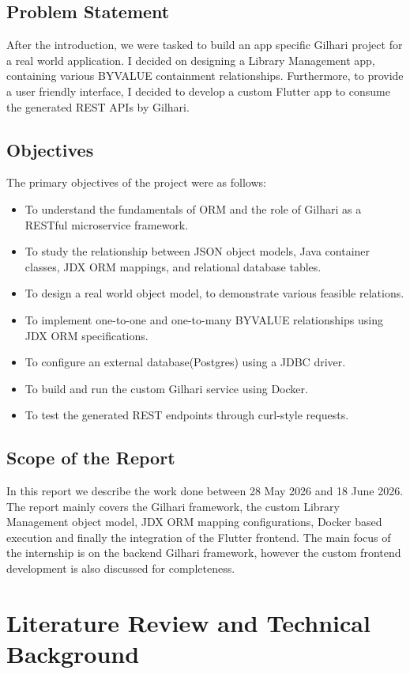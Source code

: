 \documentclass{book}
\begin{document}
\section{Problem Statement}
After the introduction, we were tasked to build an app specific Gilhari project for a real world application. I decided on designing a Library Management app, containing various BYVALUE containment relationships. Furthermore, to provide a user friendly interface, I decided to develop a custom Flutter app to consume the generated REST APIs by Gilhari.

\section{Objectives}
The primary objectives of the project were as follows:
\begin{itemize}[itemsep=0pt]
\item To understand the fundamentals of ORM and the role of Gilhari as a RESTful microservice framework.
\item To study the relationship between JSON object models, Java container classes, JDX ORM mappings, and relational database tables.
\item To design a real world object model, to demonstrate various feasible relations.
\item To implement one-to-one and one-to-many BYVALUE relationships using JDX ORM specifications.
\item To configure an external database(Postgres) using a JDBC driver.
\item To build and run the custom Gilhari service using Docker.
\item To test the generated REST endpoints through curl-style requests.
\end{itemize}

\section{Scope of the Report}
In this report we describe the work done between 28 May 2026 and 18 June 2026. The report mainly covers the Gilhari framework, the custom Library Management object model, JDX ORM mapping configurations, Docker based execution and finally the integration of the Flutter frontend. The main focus of the internship is on the backend Gilhari framework, however the custom frontend development is also discussed for completeness.

\chapter{Literature Review and Technical Background}
\end{document}
